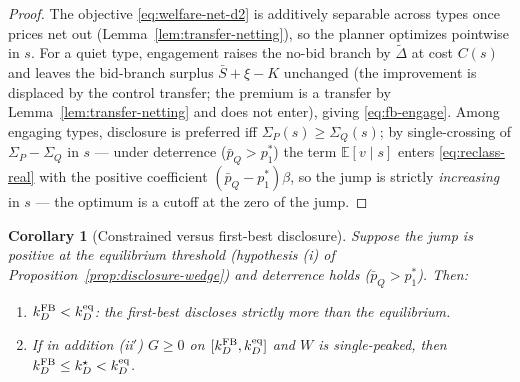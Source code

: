 \documentclass[11pt]{article}
\newtheorem{corollary}{Corollary}
\newcommand{\E}{\mathbb{E}}
\newcommand{\1}{\mathbf{1}}
\begin{document}
\begin{proof}
The objective \eqref{eq:welfare-net-d2} is additively separable across types once
prices net out (Lemma~\ref{lem:transfer-netting}), so the planner optimizes
pointwise in $s$. For a quiet type, engagement raises the no-bid branch by
$\tilde\Delta$ at cost $C(s)$ and leaves the bid-branch surplus $\bar S+\xi-K$
unchanged (the improvement is displaced by the control transfer; the premium is
a transfer by Lemma~\ref{lem:transfer-netting} and does not enter), giving
\eqref{eq:fb-engage}. Among engaging types, disclosure is preferred iff
$\Sigma_P(s)\ge\Sigma_Q(s)$; by single-crossing of $\Sigma_P-\Sigma_Q$ in $s$
--- under deterrence ($\bar p_Q>p_1^{\ast}$) the term $\E[v\mid s]$ enters
\eqref{eq:reclass-real} with the positive coefficient
$(\bar p_Q-p_1^{\ast})\beta$, so the jump is strictly \emph{increasing} in $s$
--- the optimum is a cutoff at the zero of the jump.
\end{proof}

\begin{corollary}[Constrained versus first-best disclosure]
\label{cor:cons-vs-fb}
Suppose the jump is positive at the equilibrium threshold (hypothesis (i) of
Proposition~\ref{prop:disclosure-wedge}) and deterrence holds
($\bar p_Q>p_1^{\ast}$). Then:
\begin{enumerate}[label=\textup{(\alph*)},leftmargin=2em]
\item $k_D^{\textup{FB}}<k_D^{\textup{eq}}$: the first-best discloses strictly
more than the equilibrium.
\item If in addition (ii$'$) $G\ge0$ on $[k_D^{\textup{FB}},k_D^{\textup{eq}}]$
and $W$ is single-peaked, then
$k_D^{\textup{FB}}\le k_D^{\star}<k_D^{\textup{eq}}$.
\end{enumerate}
\end{corollary}
\end{document}
